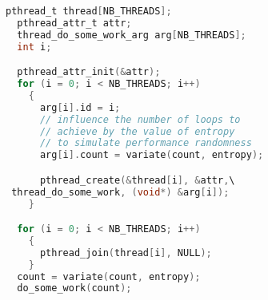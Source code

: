 \begin{lstlisting}[caption={If the constant {NB\_THREAD} is defined to a value greater than zero when compiling this code, then a multi-threaded version of the code is compiled, using pthreads. Otherwise the sequential version is generated, that simply calls the function achieving the computation.},label={lst:directive},language=C]
  pthread_t thread[NB_THREADS];
  pthread_attr_t attr;
  thread_do_some_work_arg arg[NB_THREADS];
  int i;

  pthread_attr_init(&attr);
  for (i = 0; i < NB_THREADS; i++)
    {
      arg[i].id = i;
      // influence the number of loops to
      // achieve by the value of entropy
      // to simulate performance randomness
      arg[i].count = variate(count, entropy);

      pthread_create(&thread[i], &attr,\
 thread_do_some_work, (void*) &arg[i]);
    }

  for (i = 0; i < NB_THREADS; i++)
    {
      pthread_join(thread[i], NULL);
    }
  count = variate(count, entropy);
  do_some_work(count);
\end{lstlisting}

